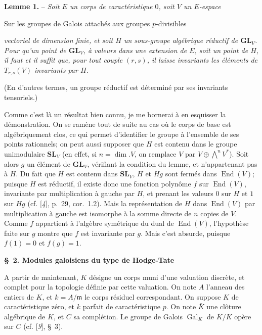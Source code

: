 \textbf{Lemme 1.} -- \textit{Soit $E$ un corps de caractéristique $0$, soit $V$ un $E$-espace}
\begin{center}\small Sur les groupes de Galois attachés aux groupes $p$-divisibles\end{center}
\textit{vectoriel de dimension finie, et soit $H$ un sous-groupe algébrique réductif de $\mathbf{GL}_V$. Pour qu’un point de $\mathbf{GL}_V$, à valeurs dans une extension de $E$, soit un point de $H$, il faut et il suffit que, pour tout couple $(r,s)$, il laisse invariants les éléments de $T_{r,s}(V)$ invariants par $H$.}

(En d’autres termes, un groupe réductif est déterminé par ses invariants tensoriels.)

Comme c’est là un résultat bien connu, je me bornerai à en esquisser la démonstration. On se ramène tout de suite au cas où le corps de base est algébriquement clos, ce qui permet d’identifier le groupe à l’ensemble de ses points rationnels; on peut aussi supposer que $H$ est contenu dans le groupe unimodulaire $\mathbf{SL}_V$ (en effet, si $n=\dim. V$, on remplace $V$ par $V\oplus\bigwedge^n V^*$). Soit alors $g$ un élément de $\mathbf{GL}_V$, vérifiant la condition du lemme, et n’appartenant pas à $H$. Du fait que $H$ est contenu dans $\mathbf{SL}_V$, $H$ et $Hg$ sont fermés dans $\operatorname{End}(V)$; puisque $H$ est réductif, il existe donc une fonction polynôme $f$ sur $\operatorname{End}(V)$, invariante par multiplication à gauche par $H$, et prenant les valeurs $0$ sur $H$ et $1$ sur $Hg$ (cf. [\textit{4}], p.~29, cor.~1.2). Mais la représentation de $H$ dans $\operatorname{End}(V)$ par multiplication à gauche est isomorphe à la somme directe de $n$ copies de $V$. Comme $f$ appartient à l’algèbre symétrique du dual de $\operatorname{End}(V)$, l’hypothèse faite sur $g$ montre que $f$ est invariante par $g$. Mais c’est absurde, puisque $f(1)=0$ et $f(g)=1$.

\begin{center}\textbf{\S~2. Modules galoisiens du type de Hodge-Tate}\end{center}

A partir de maintenant, $K$ désigne un corps muni d’une valuation discrète, et complet pour la topologie définie par cette valuation. On note $A$ l’anneau des entiers de $K$, et $k=A/\mathfrak{m}$ le corps résiduel correspondant. On suppose $K$ de caractéristique zéro, et $k$ parfait de caractéristique $p$. On note $\bar K$ une clôture algébrique de $K$, et $C$ sa complétion. Le groupe de Galois $\operatorname{Gal}_K$ de $\bar K/K$ opère sur $C$ (cf. [\textit{9}], \S~3).

